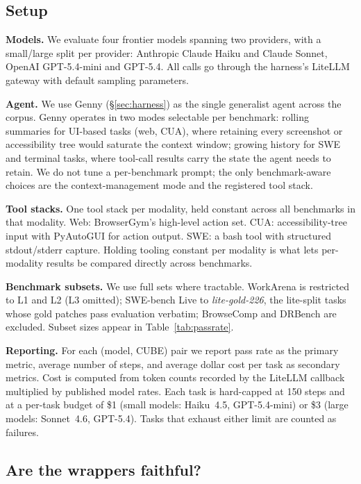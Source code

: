 \documentclass{article}
\newcommand{\mypar}[1]{\par\noindent\textbf{#1}\enspace}
\begin{document}
\subsection{Setup}
\label{sec:exp-setup}

\mypar{Models.}
We evaluate four frontier models spanning two providers, with a small/large
split per provider: Anthropic Claude Haiku and Claude Sonnet, OpenAI
GPT-5.4-mini and GPT-5.4. All calls go through the harness's LiteLLM gateway with
default sampling parameters.

\mypar{Agent.}
We use Genny (\S\ref{sec:harness}) as the single generalist agent across
the corpus. Genny operates in two modes selectable per benchmark: rolling
summaries for UI-based tasks (web, CUA), where retaining every screenshot or
accessibility tree would saturate the context window; growing history for
SWE and terminal tasks, where tool-call results carry the state the agent
needs to retain. We do not tune a per-benchmark prompt; the only
benchmark-aware choices are the context-management mode and the registered
tool stack.

\mypar{Tool stacks.}
One tool stack per modality, held constant across all benchmarks in that
modality. Web: BrowserGym's high-level action set. CUA:
accessibility-tree input with PyAutoGUI for action output. SWE: a bash tool
with structured stdout/stderr capture. Holding tooling constant per
modality is what lets per-modality results be compared directly across
benchmarks.

\mypar{Benchmark subsets.}
We use full sets where tractable. WorkArena is restricted to L1 and L2
(L3 omitted); SWE-bench Live \citep{zhang2025swebenchlive} to \emph{lite-gold-226}, the
lite-split tasks whose gold patches pass evaluation verbatim;
BrowseComp and DRBench are excluded. Subset sizes appear in
Table~\ref{tab:passrate}.

\mypar{Reporting.}
For each (model, CUBE) pair we report pass rate as the primary metric,
average number of steps, and average dollar cost per task as secondary
metrics. Cost is computed from token counts recorded by the LiteLLM
callback multiplied by published model rates. Each task is hard-capped at
150 steps and at a per-task budget of \$1 (small models: Haiku~4.5,
GPT-5.4-mini) or \$3 (large models: Sonnet~4.6, GPT-5.4). Tasks that
exhaust either limit are counted as failures.


\subsection{Are the wrappers faithful?}
\label{sec:parity}
\end{document}
